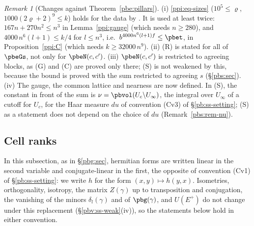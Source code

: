 \documentclass[10pt]{amsart}
\theoremstyle{definition}
\theoremstyle{remark}
\newtheorem{remark}[theorem]{Remark}
\begin{document}
\begin{remark}[Changes against Theorem~\ref{pbe:pillars}]\label{ppi:rem-sizes}
(i) \eqref{ppi:eq-sizes} ($10^5\le\varrho$, $1000(2\varrho+2)^9\le k$) holds for the data by
{\cite[Lemma~13.4(S7)]{P46}}. It is used at least twice:
$167n+270n^2\le n^3$ in Lemma~\ref{ppi:gauge} (which needs $n\ge280$), and
$4000\,n^6(l+1)\le k/4$ for $l\le n^3$, i.e.\ $b^{4000n^6(l+1)f}\le\pbet$, in
Proposition~\ref{ppi:C} (which needs $k\ge32000\,n^9$). (ii) (R) is stated for all of $\pbeGs$, not only for $\pbeN(c,c')$. (iii) $\pbeN(c,c')$
is restricted to agreeing blocks, as (G) and (C) are proved only there; (S) is not
weakened by this, because the bound is proved with the sum restricted to agreeing $s$ (\S\ref{pbs:sec}). (iv)
The gauge, the common lattice and nearness are now defined. In (S), the constant in front of the sum
is $\nu=\pbvol(U_c\backslash U_\infty)$, the integral over $U_\infty$ of a cutoff for $U_c$, for the
Haar measure $du$ of convention (Cv3) of \S\ref{pb:ss-setting}; (S) as a statement does not depend on
the choice of $du$ (Remark~\ref{pbs:rem-nu}).
\end{remark}

\subsection{Cell ranks}\label{ppi:ss-cell}

In this subsection, as in \S\ref{pbg:sec}, hermitian forms are written linear in the second variable
and conjugate-linear in the first, the opposite of convention (Cv1) of \S\ref{pb:ss-setting}: we write
$h$ for the form $(x,y)\mapsto h(y,x)$. Isometries, orthogonality, isotropy, the matrix $Z(\gamma)$ up to
transposition and conjugation, the vanishing of the minors $\delta_l(\gamma)$ and of $\pbg(\gamma)$, and
$U(E^+)$ do not change under this replacement (\S\ref{pbv:ss-weak}(iv)), so the statements below hold
in either convention.
\end{document}
